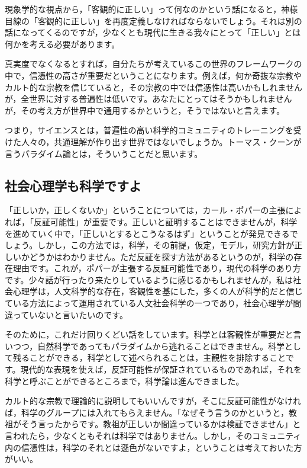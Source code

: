 \documentclass{ltjsbook}
\begin{document}
現象学的な視点から，「客観的に正しい」って何なのかという話になると，神様目線の「客観的に正しい」を再度定義しなければならないでしょう。それは別の話になってくるのですが，少なくとも現代に生きる我々にとって「正しい」とは何かを考える必要があります。

真実度でなくなるとすれば，自分たちが考えているこの世界のフレームワークの中で，信憑性の高さが重要だということになります。例えば，何か奇抜な宗教やカルト的な宗教を信じていると，その宗教の中では信憑性は高いかもしれませんが，全世界に対する普遍性は低いです。あなたにとってはそうかもしれませんが，その考え方が世界中で通用するかというと，そうではないと言えます。

つまり，サイエンスとは，普遍性の高い科学的コミュニティのトレーニングを受けた人々の，共通理解が作り出す世界ではないでしょうか。トーマス・クーンが言うパラダイム論とは，そういうことだと思います。

\subsection{社会心理学も科学ですよ}

「正しいか，正しくないか」ということについては，カール・ポパーの主張によれば，「反証可能性」が重要です。正しいと証明することはできませんが，科学を進めていく中で，「正しいとするとこうなるはず」ということが発見できるでしょう。しかし，この方法では，科学，その前提，仮定，モデル，研究方針が正しいかどうかはわかりません。ただ反証を探す方法があるというのが，科学の存在理由です。これが，ポパーが主張する反証可能性であり，現代の科学のあり方です。少々話が行ったり来たりしているように感じるかもしれませんが，私は社会心理学は，人文科学的な存在，客観性を基にした，多くの人が科学的だと信じている方法によって運用されている人文社会科学の一つであり，社会心理学が間違っていないと言いたいのです。

そのために，これだけ回りくどい話をしています。科学とは客観性が重要だと言いつつ，自然科学であってもパラダイムから逃れることはできません。科学として残ることができる，科学として述べられることは，主観性を排除することです。現代的な表現を使えば，反証可能性が保証されているものであれば，それを科学と呼ぶことができるところまで，科学論は進んできました。

カルト的な宗教で理論的に説明してもいいんですが，そこに反証可能性がなければ，科学のグループには入れてもらえません。「なぜそう言うのかというと，教祖がそう言ったからです。教祖が正しいか間違っているかは検証できません」と言われたら，少なくともそれは科学ではありません。しかし，そのコミュニティ内の信憑性は，科学のそれとは遜色がないですよ，ということは考えておいた方がいい。
\end{document}
